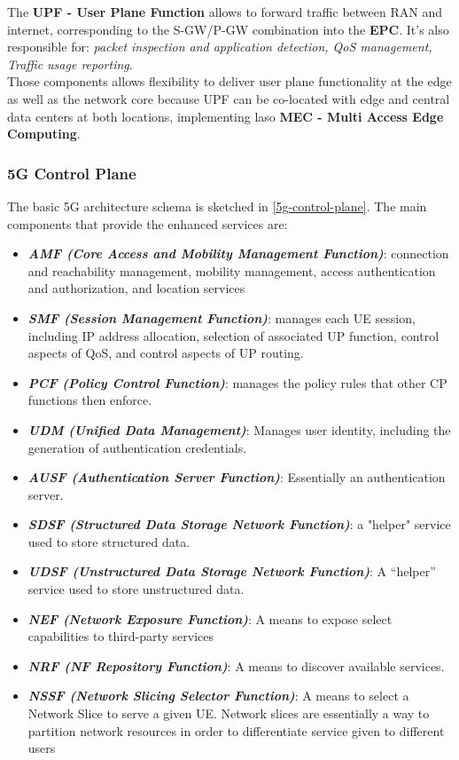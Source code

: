 \documentclass[10pt,a4paper]{report}
\theoremstyle{definition}
\begin{document}
The \textbf{UPF - User Plane Function} allows to forward traffic between RAN and internet, corresponding to the S-GW/P-GW combination into the \textbf{EPC}. It's also responsible for: \textit{packet inspection and application detection, QoS management, Traffic usage reporting}.\\
Those components allows flexibility to deliver user plane functionality at the edge as well as the network core because UPF can be co-located with edge and central data centers at both locations, implementing laso \textbf{MEC - Multi Access Edge Computing}.

\subsubsection{5G Control Plane}\label{sec:5g-control-plane}
The basic 5G architecture schema is sketched in \ref{5g-control-plane}. The main components that provide the enhanced services are:

\begin{itemize}
	\item 
	\textit{\textbf{AMF (Core Access and Mobility Management Function)}}: connection and reachability management, mobility management, access authentication and authorization, and location services
	\item 
	\textit{\textbf{SMF (Session Management Function)}}: manages each UE session, including IP address allocation, selection of associated UP function, control aspects of QoS, and control aspects of UP routing.  
	\item 
	\textit{\textbf{PCF (Policy Control Function)}}: manages the policy rules that other CP functions then enforce.
	\item 
	\textit{\textbf{UDM (Unified Data Management)}}: Manages user identity, including the generation of authentication credentials.
	\item 
	\textit{\textbf{AUSF (Authentication Server Function)}}: Essentially an authentication server. 
	\item 
	\textit{\textbf{SDSF (Structured Data Storage Network Function)}}: a "helper" service used to store structured data.
	\item 
	\textit{\textbf{UDSF (Unstructured Data Storage Network Function)}}: A “helper” service used to store unstructured data.
	\item 
	\textit{\textbf{NEF (Network Exposure Function)}}: A means to expose select capabilities to third-party services
	\item 
	\textit{\textbf{NRF (NF Repository Function)}}: A means to discover available services.
	\item 
	\textit{\textbf{NSSF (Network Slicing Selector Function)}}: A means to select a Network Slice to serve a given UE. Network slices are essentially a way to partition network resources in order to differentiate service given to different users
\end{itemize}
\end{document}
